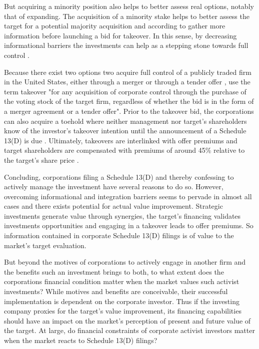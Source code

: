 \documentclass[12pt]{article}
\begin{document}
But acquiring a minority position also helps to better assess real options, notably that of expanding. The acquisition of a minority stake helps to better assess the target for a potential majority acquisition \citep{Ouimet2013} and according to \citet[p.30]{Huang2017} gather more information before launching a bid for takeover. 
In this sense, by decreasing informational barriers the investments can help as a stepping stone towards full control \citep[p.3]{Huang2017}.\par
Because there exist two options two acquire full control of a publicly traded firm in the United States, either through a merger or through a tender offer \citep[p.2]{Offenberg2015}, \citet[p.1]{Betton2008} use the term takeover "for any acquisition of corporate control through the purchase of the voting stock of the target firm, regardless of whether the bid is in the form of a merger agreement or a tender offer".
Prior to the takeover bid, the corporations can also acquire a toehold where neither management nor target's shareholders know of the investor's takeover intention until the announcement of a Schedule 13(D) is due \citep[p.158]{Eckbo2009}. Ultimately, takeovers are interlinked with offer premiums and target shareholders are compensated with premiums of around 45\% relative to the target's share price \citep[p.154]{Eckbo2009}.\par
Concluding, corporations filing a Schedule 13(D) and thereby confessing to actively manage the investment have several reasons to do so. However, overcoming informational and integration barriers seems to pervade in almost all cases and there exists potential for actual value improvement. Strategic investments generate value through synergies, the target's financing validates investments opportunities and engaging in a takeover leads to offer premiums. So information contained in corporate Schedule 13(D) filings is of value to the market's target evaluation.\par
But beyond the motives of corporations to actively engage in another firm and the benefits such an investment brings to both, to what extent does the corporations financial condition matter when the market values such activist investments?  While motives and benefits are conceivable, their successful implementation is dependent on the corporate investor. 
Thus if the investing company proxies for the target's value improvement, its financing capabilities should have an impact on the market's perception of present and future value of the target. At large, do financial constraints of corporate activist investors matter when the market reacts to Schedule 13(D) filings?\par
\end{document}
